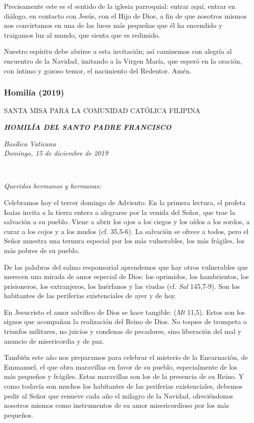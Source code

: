 Precisamente este es el sentido de la iglesia parroquial: entrar aquí, entrar en diálogo, en contacto con Jesús, con el Hijo de Dios, a fin de que nosotros mismos nos convirtamos en una de las luces más pequeñas que él ha encendido y traigamos luz al mundo, que sienta que es redimido.

Nuestro espíritu debe abrirse a esta invitación; así caminemos con alegría al encuentro de la Navidad, imitando a la Virgen María, que esperó en la oración, con íntimo y gozoso temor, el nacimiento del Redentor. Amén.

\subsubsection{Homilía (2019)} SANTA MISA PARA LA COMUNIDAD CATÓLICA FILIPINA

\textbf{\emph{HOMILÍA DEL SANTO PADRE FRANCISCO}}

\emph{Basílica Vaticana\\ Domingo, 15 de diciembre de 2019}



~

\emph{Queridos hermanos y hermanas:}

Celebramos hoy el tercer domingo de Adviento. En la primera lectura, el profeta Isaías invita a la tierra entera a alegrarse por la venida del Señor, que trae la salvación a su pueblo. Viene a abrir los ojos a los ciegos y los oídos a los sordos, a curar a los cojos y a los mudos (cf. 35,5-6). La salvación se ofrece a todos, pero el Señor muestra una ternura especial por los más vulnerables, los más frágiles, los más pobres de su pueblo.

De las palabras del salmo responsorial aprendemos que hay otros vulnerables que merecen una mirada de amor especial de Dios: los oprimidos, los hambrientos, los prisioneros, los extranjeros, los huérfanos y las viudas (cf. \emph{Sal} 145,7-9). Son los habitantes de las periferias existenciales de ayer y de hoy.

En Jesucristo el amor salvífico de Dios se hace tangible:  (\emph{Mt} 11,5). Estos son los signos que acompañan la realización del Reino de Dios. No toques de trompeta o triunfos militares, no juicios y condenas de pecadores, sino liberación del mal y anuncio de misericordia y de paz.

También este año nos preparamos para celebrar el misterio de la Encarnación, de Emmanuel, el  que obra maravillas en favor de su pueblo, especialmente de los más pequeños y frágiles. Estas maravillas son los  de la presencia de su Reino. Y como todavía son muchos los habitantes de las periferias existenciales, debemos pedir al Señor que renueve cada año el milagro de la Navidad, ofreciéndonos nosotros mismos como instrumentos de su amor misericordioso por los más pequeños.

